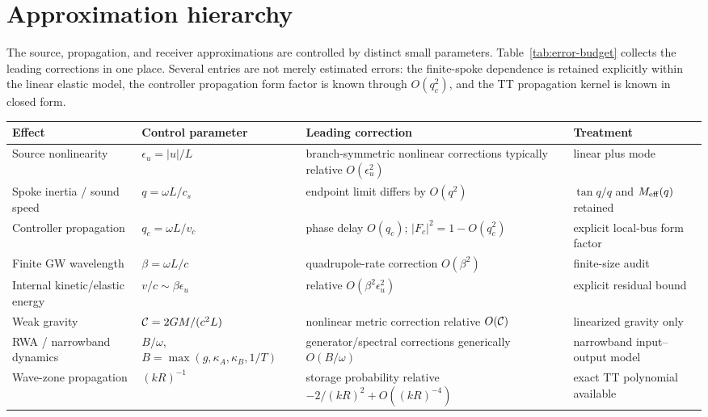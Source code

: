 \section{Approximation hierarchy}
\label{sec:error-budget}

The source, propagation, and receiver approximations are controlled by distinct small parameters. Table~\ref{tab:error-budget} collects the leading corrections in one place. Several entries are not merely estimated errors: the finite-spoke dependence is retained explicitly within the linear elastic model, the controller propagation form factor is known through $O(q_c^2)$, and the TT propagation kernel is known in closed form.

\begin{table}[H]
\centering
\small
\begin{tabular}{p{}p{}p{}p{}}
\toprule
Effect & Control parameter & Leading correction & Treatment \\
\midrule
Source nonlinearity
& $\epsilon_u=|u|/L$
& branch-symmetric nonlinear corrections typically relative $O(\epsilon_u^2)$
& linear plus mode \\

Spoke inertia / sound speed
& $q=\omega L/c_s$
& endpoint limit differs by $O(q^2)$
& $\tan q/q$ and $M_{\rm eff}(q)$ retained \\

Controller propagation
& $q_c=\omega L/v_c$
& phase delay $O(q_c)$; $|F_c|^2=1-O(q_c^2)$
& explicit local-bus form factor \\

Finite GW wavelength
& $\beta=\omega L/c$
& quadrupole-rate correction $O(\beta^2)$
& finite-size audit \\

Internal kinetic/elastic energy
& $v/c\sim\beta\epsilon_u$
& relative $O(\beta^2\epsilon_u^2)$
& explicit residual bound \\

Weak gravity
& $\mathcal C=2GM/(c^2L)$
& nonlinear metric correction relative $O(\mathcal C)$
& linearized gravity only \\

RWA / narrowband dynamics
& $B/\omega$, $B=\max(g,\kappa_A,\kappa_B,1/T)$
& generator/spectral corrections generically $O(B/\omega)$
& narrowband input--output model \\

Wave-zone propagation
& $(kR)^{-1}$
& storage probability relative $-2/(kR)^2+O((kR)^{-4})$
& exact TT polynomial available \\


\end{tabular}
\end{table}
